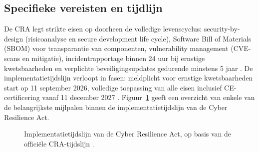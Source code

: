 \subsection{Specifieke vereisten en tijdlijn}
De CRA legt strikte eisen op doorheen de volledige levenscyclus: security-by-design (risicoanalyse en secure development life cycle), Software Bill of Materials (SBOM) voor transparantie van componenten, vulnerability management (CVE-scans en mitigatie), incidentrapportage binnen 24 uur bij ernstige kwetsbaarheden en verplichte beveiligingsupdates gedurende minstens 5 jaar \autocite{EU_CRA}. De implementatietijdslijn verloopt in fasen: meldplicht voor ernstige kwetsbaarheden start op 11 september 2026, volledige toepassing van alle eisen inclusief CE-certificering vanaf 11 december 2027 \autocite{RDI2024CRA}.
Figuur~\ref{fig:cra-tijdslijn} geeft een overzicht van enkele van de belangrijkste mijlpalen binnen de implementatietijdslijn van de Cyber Resilience Act.
\begin{figure}[h]
  \centering
  \caption[Implementatietijdslijn CRA]{Implementatietijdslijn van de Cyber Resilience Act, op basis van de officiële CRA-tijdslijn \autocite{RDI2024CRA,EuropeanCommission2024CRAnews}.}
  \label{fig:cra-tijdslijn}
\end{figure}

